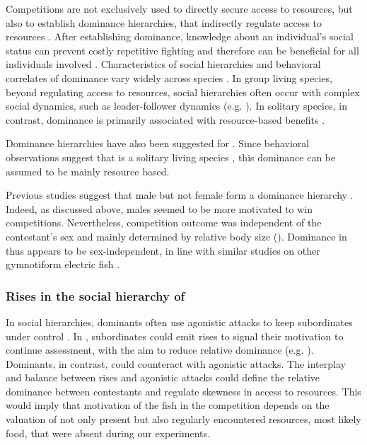 Competitions are not exclusively used to directly secure access to resources, but also to establish dominance hierarchies, that indirectly regulate access to resources \citep{Wauters1992, Sapolsky2005, Taves2009}. After establishing dominance, knowledge about an individual's social status can prevent costly repetitive fighting and therefore can be beneficial for all individuals involved \citep{Fernald2014, Huyghe2005}. Characteristics of social hierarchies and behavioral correlates of dominance vary widely across species \citep{Cluttonbrock1979, Cigliano1993, Sapolsky2005}. In group living species, beyond regulating access to resources, social hierarchies often occur with complex social dynamics, such as leader-follower dynamics (e.g. \citealp{Strandburg2018, Jason1990}). In solitary species, in contrast, dominance is primarily associated with resource-based benefits \citep{Cigliano1993}.

Dominance hierarchies have also been suggested for \lepto{} \citep{Hagedorn1985, Dunlap2002}. Since behavioral observations suggest that \lepto{} is a solitary living species \citep{Stamper2010, Raab2019, Henninger2020}, this dominance can be assumed to be mainly resource based.

Previous studies suggest that male but not female \lepto{} form a dominance hierarchy \citep{Hagedorn1985, Dunlap2002}. Indeed, as discussed above, males seemed to be more motivated to win competitions. Nevertheless, competition outcome was independent of the contestant's sex and mainly determined by relative body size (). Dominance in \lepto{} thus appears to be sex-independent, in line with similar studies on other gymnotiform electric fish \citep{Silva2012, Zubizarreta2020}.

\subsubsection{Rises in the social hierarchy of \lepto{}}

In social hierarchies, dominants often use agonistic attacks to keep subordinates under control \citep{Cluttonbrock1979, Creel1996, Janson1985}. In \lepto{}, subordinates could emit rises to signal their motivation to continue assessment, with the aim to reduce relative dominance (e.g. \citealp{Kareklas2019}). Dominants, in contrast, could counteract with agonistic attacks. The interplay and balance between rises and agonistic attacks could define the relative dominance between contestants and regulate skewness in access to resources. This would imply that motivation of the fish in the competition depends on the valuation of not only present but also regularly encountered resources, most likely food, that were absent during our experiments.

